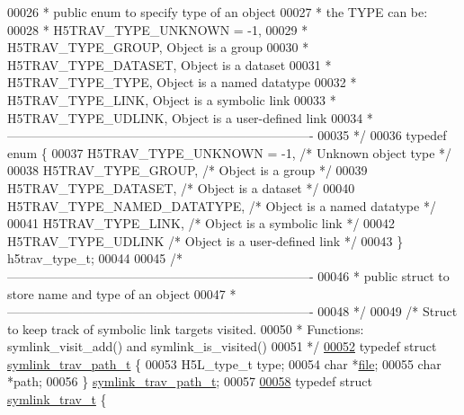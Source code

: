 \begin{DoxyCode}
00026 \textcolor{comment}{ * public enum to specify type of an object}
00027 \textcolor{comment}{ * the TYPE can be:}
00028 \textcolor{comment}{ *    H5TRAV\_TYPE\_UNKNOWN = -1,}
00029 \textcolor{comment}{ *    H5TRAV\_TYPE\_GROUP,            Object is a group}
00030 \textcolor{comment}{ *    H5TRAV\_TYPE\_DATASET,          Object is a dataset}
00031 \textcolor{comment}{ *    H5TRAV\_TYPE\_TYPE,             Object is a named datatype}
00032 \textcolor{comment}{ *    H5TRAV\_TYPE\_LINK,             Object is a symbolic link}
00033 \textcolor{comment}{ *    H5TRAV\_TYPE\_UDLINK,           Object is a user-defined link}
00034 \textcolor{comment}{ *-------------------------------------------------------------------------}
00035 \textcolor{comment}{ */}
00036 \textcolor{keyword}{typedef} \textcolor{keyword}{enum} \{
00037     H5TRAV\_TYPE\_UNKNOWN = -1,        \textcolor{comment}{/* Unknown object type */}
00038     H5TRAV\_TYPE\_GROUP,          \textcolor{comment}{/* Object is a group */}
00039     H5TRAV\_TYPE\_DATASET,        \textcolor{comment}{/* Object is a dataset */}
00040     H5TRAV\_TYPE\_NAMED\_DATATYPE, \textcolor{comment}{/* Object is a named datatype */}
00041     H5TRAV\_TYPE\_LINK,           \textcolor{comment}{/* Object is a symbolic link */}
00042     H5TRAV\_TYPE\_UDLINK          \textcolor{comment}{/* Object is a user-defined link */}
00043 \} h5trav\_type\_t;
00044 
00045 \textcolor{comment}{/*-------------------------------------------------------------------------}
00046 \textcolor{comment}{ * public struct to store name and type of an object}
00047 \textcolor{comment}{ *-------------------------------------------------------------------------}
00048 \textcolor{comment}{ */}
00049 \textcolor{comment}{/* Struct to keep track of symbolic link targets visited.}
00050 \textcolor{comment}{ * Functions: symlink\_visit\_add() and symlink\_is\_visited()}
00051 \textcolor{comment}{ */}
\hyperlink{structsymlink__trav__path__t}{00052} \textcolor{keyword}{typedef} \textcolor{keyword}{struct }\hyperlink{structsymlink__trav__path__t}{symlink\_trav\_path\_t} \{
00053     H5L\_type\_t  type;
00054     \textcolor{keywordtype}{char} *\hyperlink{structfile}{file};
00055     \textcolor{keywordtype}{char} *path;
00056 \} \hyperlink{structsymlink__trav__path__t}{symlink\_trav\_path\_t};
00057 
\hyperlink{structsymlink__trav__t}{00058} \textcolor{keyword}{typedef} \textcolor{keyword}{struct }\hyperlink{structsymlink__trav__t}{symlink\_trav\_t} \{

\end{DoxyCode}
